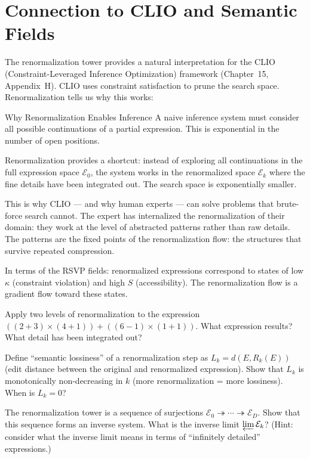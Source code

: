 \section{Connection to CLIO and Semantic Fields}

The renormalization tower provides a natural interpretation for the
CLIO (Constraint-Leveraged Inference Optimization) framework
(Chapter~15, Appendix~H). CLIO uses constraint satisfaction to prune
the search space. Renormalization tells us why this works:

\begin{conceptaside}{Why Renormalization Enables Inference}
  A naive inference system must consider all possible continuations of
  a partial expression. This is exponential in the number of open positions.

  Renormalization provides a shortcut: instead of exploring all
  continuations in the full expression space $\mathcal{E}_0$, the system
  works in the renormalized space $\mathcal{E}_k$ where the fine details
  have been integrated out. The search space is exponentially smaller.

  This is why CLIO — and why human experts — can solve problems that
  brute-force search cannot. The expert has internalized the renormalization
  of their domain: they work at the level of abstracted patterns rather
  than raw details. The patterns are the fixed points of the renormalization
  flow: the structures that survive repeated compression.

  In terms of the RSVP fields: renormalized expressions correspond to
  states of low $\kappa$ (constraint violation) and high $S$ (accessibility).
  The renormalization flow is a gradient flow toward these states.
\end{conceptaside}

\begin{exercise}
  Apply two levels of renormalization to the expression
  $((2+3) \times (4+1)) + ((6-1) \times (1+1))$.
  What expression results? What detail has been integrated out?
\end{exercise}

\begin{exercise}
  Define ``semantic lossiness'' of a renormalization step as
  $L_k = d(E, R_k(E))$ (edit distance between the original and
  renormalized expression). Show that $L_k$ is monotonically
  non-decreasing in $k$ (more renormalization = more lossiness).
  When is $L_k = 0$?
\end{exercise}

\begin{exercise}[title={Algebraic}]
  The renormalization tower is a sequence of surjections
  $\mathcal{E}_0 \twoheadrightarrow \cdots \twoheadrightarrow \mathcal{E}_D$.
  Show that this sequence forms an inverse system. What is the
  inverse limit $\varprojlim \mathcal{E}_k$? (Hint: consider what
  the inverse limit means in terms of ``infinitely detailed'' expressions.)
\end{exercise}
